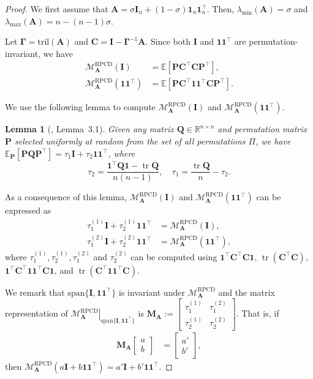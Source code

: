 \documentclass{article}
\theoremstyle{plain}
\newtheorem{lemma}[theorem]{Lemma}
\theoremstyle{definition}
\theoremstyle{remark}
\renewcommand{\sp}{\mathrm{span}}
\newcommand{\tril}{\mathrm{tril}}
\newcommand{\mGamma}{\bm{\Gamma}}
\newcommand{\RPCD}{\text{RPCD}} %
\newcommand{\MARPCD}{\mathcal{M}_{\bm{A}}^{\RPCD}} %
\def\vone{{\bm{1}}}
\def\mA{{\bm{A}}}
\def\mC{{\bm{C}}}
\def\mI{{\bm{I}}}
\def\mM{{\bm{M}}}
\def\mP{{\bm{P}}}
\def\mQ{{\bm{Q}}}
\newcommand{\E}{\mathbb{E}}
\newcommand{\R}{\mathbb{R}}
\DeclareMathOperator{\tr}{tr}
\begin{document}
\begin{proof}
We first assume that $\mA = \sigma \mI_n + (1-\sigma) \vone_n \vone_n^{\top}$. Then, $\lambda_{\min}(\mA) = \sigma$ and $\lambda_{\max}(\mA) = n-(n-1)\sigma$.

Let $\mGamma = \tril(\mA)$ and $\mC = \mI - \mGamma^{-1} \mA$.
Since both $\mI$ and $\vone \vone^{\top}$ are permutation-invariant, we have 
\begin{align*}
    \MARPCD(\mI) &= \E [\mP \mC^{\top} \mC \mP^{\top}], \\
    \MARPCD(\vone \vone^{\top}) &= \E [\mP \mC^{\top} \vone \vone^{\top} \mC \mP^{\top}].
\end{align*}

We use the following lemma to compute $\MARPCD(\mI)$ and $\MARPCD(\vone \vone^{\top})$.
\begin{lemma}[\citet{lee2019}, Lemma~3.1]
    \label{lem:expectedperm}
    Given any matrix $\mQ\in \R^{n\times n}$ and permutation matrix $\mP$ selected uniformly at random from the set of all permutations $\Pi$, we have
    $\E_{\mP} [\mP\mQ\mP^{\top}] = \tau_1 \mI +\tau_2 \vone \vone^{\top}$, where \[
    \tau_2=\frac{\vone^{\top} \mQ \vone - \tr \mQ}{n(n-1)},\quad \tau_1=\frac{\tr \mQ}{n}-\tau_2.
    \]
\end{lemma}

As a consequence of this lemma, $\MARPCD(\mI)$ and $\MARPCD(\vone \vone^{\top})$ can be expressed as 
\begin{align*}
    \tau_1^{(1)}\mI+\tau_2^{(1)}\vone \vone^{\top} &= \MARPCD(\mI), \\
    \tau_1^{(2)}\mI+\tau_2^{(2)}\vone \vone^{\top} &= \MARPCD(\vone \vone^{\top}),
\end{align*}
where $\tau_1^{(1)}, \tau_2^{(1)}, \tau_1^{(2)}$ and $\tau_2^{(2)}$ can be computed using $\vone^{\top} \mC^{\top} \mC \vone$, $\tr (\mC^{\top} \mC)$, $\vone^{\top} \mC^{\top} \vone \vone^{\top} \mC \vone$, and $\tr (\mC^{\top} \vone \vone^{\top} \mC)$.

We remark that $\sp\{\mI, \vone \vone^{\top}\}$ is invariant under $\MARPCD$ and the matrix representation of $\left. \MARPCD \right|_{\sp\{\mI, \vone \vone^{\top}\}}$ is 
$\mM_{\mA} := \begin{bmatrix}
    \tau_1^{(1)} & \tau_1^{(2)} \\
    \tau_2^{(1)} & \tau_2^{(2)}
\end{bmatrix}$.
That is, if 
\begin{align*}
    \mM_{\mA} \begin{bmatrix}
    a\\
    b
\end{bmatrix} &= \begin{bmatrix}
    a'\\
    b'
\end{bmatrix},
\end{align*}
then $\MARPCD(a\mI + b \vone \vone^{\top}) = a'\mI + b' \vone \vone^{\top}$.


\end{proof}
\end{document}
